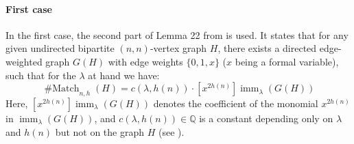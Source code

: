 \documentclass[11pt, DIV=15]{scrarticle}
\theoremstyle{definition}
\theoremstyle{plain}
\theoremstyle{remark}
\newcommand{\bbQ}{\mathbb{Q}}
\DeclareMathOperator{\imm}{imm}
\DeclareMathOperator{\Match}{\# Match}
\begin{document}
\paragraph*{First case}
In the first case, the second part of Lemma 22 from \cite{curticapean2021full} is used. It states that for any given undirected bipartite $(n,n)$-vertex graph $H$, there exists a directed edge-weighted graph $G(H)$ with edge weights $\{0,1,x\}$ ($x$ being a formal variable), such that for the $\lambda$ at hand we have:
\begin{equation}
\Match_{n,h}(H) = c(\lambda, h(n)) \cdot [x^{2h(n)}] \imm_{\lambda}(G(H)) \label{eq:star2}
\end{equation}
Here, $[x^{2h(n)}] \imm_{\lambda}(G(H))$ denotes the coefficient of the monomial $x^{2h(n)}$ in $\imm_{\lambda}(G(H))$, and $c(\lambda, h(n)) \in \bbQ$ is a constant depending only on $\lambda$ and $h(n)$ but not on the graph $H$ (see \cite[Lemma 26]{curticapean2021complexitydichotomyimmanantfamilies}).
\end{document}
